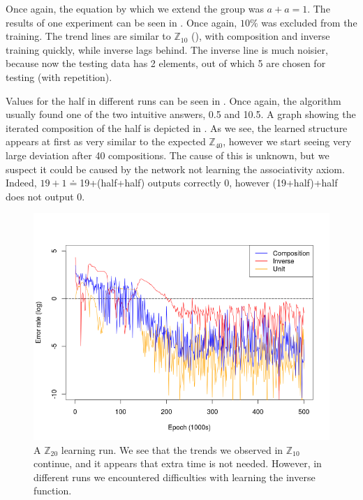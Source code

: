Once again, the equation by which we extend the group was $a+a=1$. The results of one experiment can be seen in . Once again, $10\%$ was excluded from the training. The trend lines are similar to $\mathbb{Z}_{10}$ (), with composition and inverse training quickly, while inverse lags behind. The inverse line is much noisier, because now the testing data has 2 elements, out of which 5 are chosen for testing (with repetition).

Values for the half in different runs can be seen in . Once again, the algorithm usually found one of the two intuitive answers, 0.5 and 10.5. A graph showing the iterated composition of the half is depicted in . As we see, the learned structure appears at first as very similar to the expected $\mathbb{Z}_{40}$, however we start seeing very large deviation after 40 compositions. The cause of this is unknown, but we suspect it could be caused by the network not learning the associativity axiom. Indeed, $19+1\doteq$19+(half+half) outputs correctly $0$, however (19+half)+half does not output 0.

\begin{figure}[h]
\centering
\caption{A $\mathbb{Z}_{20}$ learning run. We see that the trends we observed in $\mathbb{Z}_{10}$ continue, and it appears that extra time is not needed. However, in different runs we encountered difficulties with learning the inverse function.}
\label{graph:z20_90percent}
\includegraphics[width=\linewidth]{../img/z20_90percent.png}
\end{figure}

